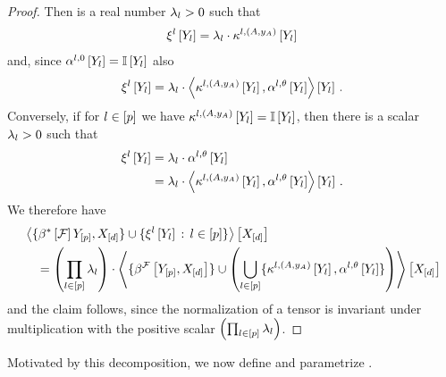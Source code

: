 \begin{proof}
    Then is a real number $\lambda_{l}>0$ such that
    \begin{align*}
        \xi^{l}\left[Y_{l}\right]
        = \lambda_{l} \cdot \kappa^{l,(A,y_{A})}\left[Y_{l}\right]
    \end{align*}
    and, since $\alpha^{l,0}\left[Y_{l}\right] = \mathbb{I}\left[Y_{l}\right]$ also
    \begin{align*}
        \xi^{l}\left[Y_{l}\right]
        = \lambda_{l} \cdot \left\langle \kappa^{l,(A,y_{A})}\left[Y_{l}\right],\alpha^{l,\theta}\left[Y_{l}\right]\right\rangle \left[ Y_{l} \right] \, .
    \end{align*}
    Conversely, if for $l\in[p]$ we have $\kappa^{l,(A,y_{A})}\left[Y_{l}\right]=\mathbb{I}\left[Y_{l}\right]$, then there is a scalar $\lambda_{l}>0$ such that
    \begin{align*}
        \xi^{l}\left[Y_{l}\right]
        &= \lambda_{l} \cdot \alpha^{l,\theta}\left[Y_{l}\right] \\
        &= \lambda_{l} \cdot \left\langle \kappa^{l,(A,y_{A})}\left[Y_{l}\right],\alpha^{l,\theta}\left[Y_{l}\right]\right\rangle \left[ Y_{l} \right] \, .
    \end{align*}
    We therefore have
    \begin{align*}
        &\left\langle 
            \{\beta^{*}\left[\mathcal{F}\right]{Y_{[p]},X_{[d]}}\}
            \cup \{\xi^{l}\left[Y_{l}\right]\,:\,l\in[p]\}
        \right\rangle \left[ X_{[d]} \right]\\
        &\quad =\left(\prod_{l\in[p]}\lambda_{l}\right)\cdot\left\langle 
            \{\beta^{\mathcal{F}}\left[Y_{[p]},X_{[d]}\right]\}
            \cup \left(\bigcup_{l\in[p]}\{\kappa^{l,(A,y_{A})}\left[Y_{l}\right],\alpha^{l,\theta}\left[Y_{l}\right]\}\right)
        \right\rangle \left[ X_{[d]} \right]
    \end{align*}
    and the claim follows, since the normalization of a tensor is invariant under multiplication with the positive scalar $\left(\prod_{l\in[p]}\lambda_{l}\right)$.
\end{proof}

Motivated by this decomposition, we now define and parametrize \HybridLogicNetworks{}.

